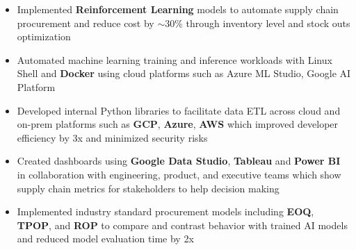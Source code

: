 \documentclass[12pt,a4paper,roman]{moderncv}
\begin{document}
{{\begin{itemize}
\item Implemented \textbf{Reinforcement Learning} models to automate supply chain procurement and reduce cost by $\sim$30\% through inventory level and stock outs optimization
%
\item Automated machine learning training and inference workloads with Linux Shell and \textbf{Docker} using cloud platforms such as Azure ML Studio, Google AI Platform
\item Developed internal Python libraries to facilitate data ETL across cloud and on-prem platforms such as \textbf{GCP}, \textbf{Azure}, \textbf{AWS} which improved developer efficiency by 3x and minimized security risks
\item Created dashboards using \textbf{Google Data Studio}, \textbf{Tableau} and \textbf{Power BI} in collaboration with engineering, product, and executive teams which show supply chain metrics for stakeholders to help decision making
\item Implemented industry standard procurement models including \textbf{EOQ}, \textbf{TPOP}, and \textbf{ROP} to compare and contrast behavior with trained AI models and reduced model evaluation time by 2x

\end{itemize}}}
\end{document}

